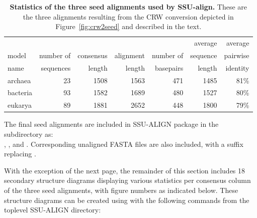 \begin{table}[h]
\begin{center}
\begin{tabular}{lrrrrrr} \hline
        &           &           &           &           & average   & average  \\
model   & number of & consensus & alignment & number of & sequence  & pairwise \\
name    & sequences & length    & length    & basepairs & length    & identity \\ \hline
archaea & 23        & 1508      & 1563      & 471       & 1485      & 81\%     \\
bacteria& 93        & 1582      & 1689      & 480       & 1527      & 80\%     \\
eukarya  & 89       & 1881      & 2652      & 448       & 1800      & 79\%     \\ 
\end{tabular}
\caption[Statistics of the three seed alignments used by SSU-align.]
{\textbf{Statistics of the three seed alignments used by
    SSU-align.} These are the three alignments resulting from the
    CRW conversion depicted in Figure~\ref{fig:crw2seed} and
    described in the text.}
\label{tbl:finalseeds}
\end{center}
\end{table}

\newpage 

The final seed alignments are included in SSU-ALIGN package in
the  subdirectory as: \\ ,
, and . Corresponding
unaligned FASTA files are also included, with a  suffix
replacing . 

With the exception of the next page, the remainder of this section
includes 18 secondary structure diagrams displaying various statistics
per consensus column of the three seed alignments, with figure numbers
as indicated below. These structure diagrams can be created using
 with the following commands from the toplevel
SSU-ALIGN directory:


